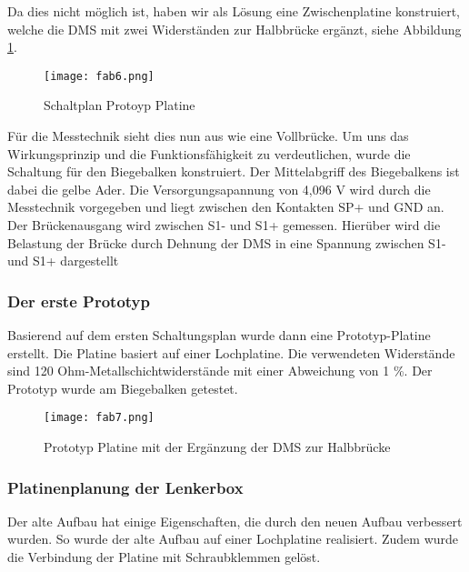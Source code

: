 Da dies nicht möglich ist, haben wir als Lösung eine Zwischenplatine konstruiert, welche die DMS mit zwei Widerständen zur Halbbrücke ergänzt, siehe Abbildung \ref{fig:fab6}.

\begin{figure}[h]
    \begin{center}
        \texttt{[image: fab6.png]}
        \caption[Schaltplan Protoyp Platine (Abbildungsverzeichnis)]{Schaltplan Protoyp Platine}
        
        \label{fig:fab6}
    \end{center}
\end{figure}

Für die Messtechnik sieht dies nun aus wie eine Vollbrücke. Um uns das Wirkungsprinzip und die Funktionsfähigkeit zu verdeutlichen, wurde die Schaltung für den Biegebalken konstruiert.
Der Mittelabgriff des Biegebalkens ist dabei die gelbe Ader. Die Versorgungsapannung von 4,096 V wird durch die Messtechnik vorgegeben und liegt zwischen den Kontakten SP+ und GND an. Der Brückenausgang wird zwischen S1- und S1+ gemessen. Hierüber wird die Belastung der Brücke durch Dehnung der DMS in eine Spannung zwischen S1- und S1+ dargestellt
\subsubsection{Der erste Prototyp}
Basierend auf dem ersten Schaltungsplan wurde dann eine Prototyp-Platine erstellt. Die Platine basiert auf einer Lochplatine.
Die verwendeten Widerstände sind 120 Ohm-Metallschichtwiderstände mit einer Abweichung von 1 \%. Der Prototyp wurde am Biegebalken getestet.
\begin{figure}[h]
    \begin{center}
        \texttt{[image: fab7.png]}
        \caption[Prototyp Platine mit der Ergänzung der DMS zur Halbbrücke (Abbildungsverzeichnis)]{Prototyp Platine mit der Ergänzung der DMS zur Halbbrücke}
        
        \label{fig:fab7}
    \end{center}
\end{figure}



\subsubsection{Platinenplanung der Lenkerbox}
Der alte Aufbau hat einige Eigenschaften, die durch den neuen Aufbau verbessert wurden. So wurde der alte Aufbau auf einer Lochplatine realisiert.
Zudem wurde die Verbindung der Platine mit Schraubklemmen gelöst.

